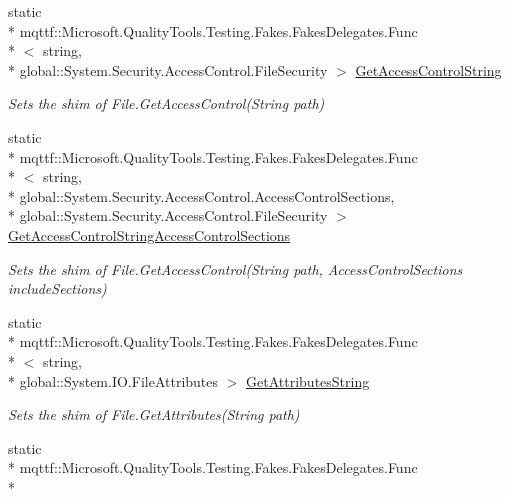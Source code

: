 \begin{DoxyCompactItemize}
static \\*
mqttf\-::\-Microsoft.\-Quality\-Tools.\-Testing.\-Fakes.\-Fakes\-Delegates.\-Func\\*
$<$ string, \\*
global\-::\-System.\-Security.\-Access\-Control.\-File\-Security $>$ \hyperlink{class_system_1_1_i_o_1_1_fakes_1_1_shim_file_a90bc1323f8746e5c1c6da950c49d461b}{Get\-Access\-Control\-String}
\begin{DoxyCompactList}\small\item\em Sets the shim of File.\-Get\-Access\-Control(\-String path)\end{DoxyCompactList}\item 
static \\*
mqttf\-::\-Microsoft.\-Quality\-Tools.\-Testing.\-Fakes.\-Fakes\-Delegates.\-Func\\*
$<$ string, \\*
global\-::\-System.\-Security.\-Access\-Control.\-Access\-Control\-Sections, \\*
global\-::\-System.\-Security.\-Access\-Control.\-File\-Security $>$ \hyperlink{class_system_1_1_i_o_1_1_fakes_1_1_shim_file_a3a41e935bdfc8f3202d7e793f7cf929e}{Get\-Access\-Control\-String\-Access\-Control\-Sections}
\begin{DoxyCompactList}\small\item\em Sets the shim of File.\-Get\-Access\-Control(\-String path, Access\-Control\-Sections include\-Sections)\end{DoxyCompactList}\item 
static \\*
mqttf\-::\-Microsoft.\-Quality\-Tools.\-Testing.\-Fakes.\-Fakes\-Delegates.\-Func\\*
$<$ string, \\*
global\-::\-System.\-I\-O.\-File\-Attributes $>$ \hyperlink{class_system_1_1_i_o_1_1_fakes_1_1_shim_file_a98ebec2ff6d6c3b80b939b1107235056}{Get\-Attributes\-String}
\begin{DoxyCompactList}\small\item\em Sets the shim of File.\-Get\-Attributes(\-String path)\end{DoxyCompactList}\item 
static \\*
mqttf\-::\-Microsoft.\-Quality\-Tools.\-Testing.\-Fakes.\-Fakes\-Delegates.\-Func\\*

\end{DoxyCompactItemize}
